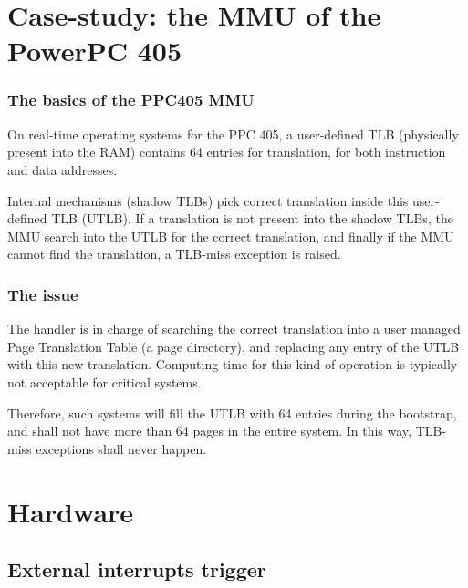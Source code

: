 %
%

\section{Case-study: the MMU of the PowerPC 405}


\begin{frame}
  \frametitle{The basics of the PPC405 MMU}

On real-time operating systems for the PPC 405, a user-defined TLB (physically present into the RAM) contains 64 entries for translation, for both instruction and data addresses.

\-

Internal mechanisms (shadow TLBs) pick correct translation inside this user-defined TLB (UTLB). If a translation is not present into the shadow TLBs, the MMU search into the UTLB for the correct translation, and finally if the MMU cannot find the translation, a TLB-miss exception is raised.

\end{frame}


\begin{frame}
  \frametitle{The issue}

The handler is in charge of searching the correct translation into a user managed Page Translation Table (a page directory), and replacing any entry of the UTLB with this new translation. Computing time for this kind of operation is typically not acceptable for critical systems.

\-

Therefore, such systems will fill the UTLB with 64 entries during the bootstrap, and shall not have more than 64 pages in the entire system. In this way, TLB-miss exceptions shall never happen.

\end{frame}

%
%

\section{Hardware}

\subsection{External interrupts trigger}


